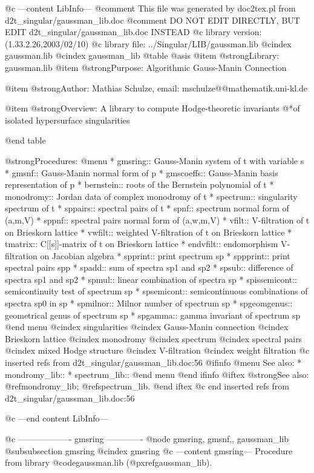 @c ---content LibInfo---
@comment This file was generated by doc2tex.pl from d2t_singular/gaussman_lib.doc
@comment DO NOT EDIT DIRECTLY, BUT EDIT d2t_singular/gaussman_lib.doc INSTEAD
@c library version: (1.33.2.26,2003/02/10)
@c library file: ../Singular/LIB/gaussman.lib
@cindex gaussman.lib
@cindex gaussman_lib
@table @asis
@item @strong{Library:}
gaussman.lib
@item @strong{Purpose:}
  Algorithmic Gauss-Manin Connection

@item @strong{Author:}
Mathias Schulze, email: mschulze@@mathematik.uni-kl.de

@item @strong{Overview:}
A library to compute Hodge-theoretic invariants
@*of isolated hypersurface singularities

@end table

@strong{Procedures:}
@menu
* gmsring:: Gauss-Manin system of t with variable s
* gmsnf:: Gauss-Manin normal form of p
* gmscoeffs:: Gauss-Manin basis representation of p
* bernstein:: roots of the Bernstein polynomial of t
* monodromy:: Jordan data of complex monodromy of t
* spectrum:: singularity spectrum of t
* sppairs:: spectral pairs of t
* spnf:: spectrum normal form of (a,m,V)
* sppnf:: spectral pairs normal form of (a,w,m,V)
* vfilt:: V-filtration of t on Brieskorn lattice
* vwfilt:: weighted V-filtration of t on Brieskorn lattice
* tmatrix:: C[[s]]-matrix of t on Brieskorn lattice
* endvfilt:: endomorphism V-filtration on Jacobian algebra
* spprint:: print spectrum sp
* sppprint:: print spectral pairs spp
* spadd:: sum of spectra sp1 and sp2
* spsub:: difference of spectra sp1 and sp2
* spmul:: linear combination of spectra sp
* spissemicont:: semicontinuity test of spectrum sp
* spsemicont:: semicontinuous combinations of spectra sp0 in sp
* spmilnor:: Milnor number of spectrum sp
* spgeomgenus:: geometrical genus of spectrum sp
* spgamma:: gamma invariant of spectrum sp
@end menu
@cindex singularities
@cindex Gauss-Manin connection
@cindex Brieskorn lattice
@cindex monodromy
@cindex spectrum
@cindex spectral pairs
@cindex mixed Hodge structure
@cindex V-filtration
@cindex weight filtration
@c inserted refs from d2t_singular/gaussman_lib.doc:56
@ifinfo
@menu
See also:
* mondromy_lib::
* spectrum_lib::
@end menu
@end ifinfo
@iftex
@strong{See also:}
@ref{mondromy_lib};
@ref{spectrum_lib}.
@end iftex
@c end inserted refs from d2t_singular/gaussman_lib.doc:56

@c ---end content LibInfo---

@c ------------------- gmsring -------------
@node gmsring, gmsnf,, gaussman_lib
@subsubsection gmsring
@cindex gmsring
@c ---content gmsring---
Procedure from library @code{gaussman.lib} (@pxref{gaussman_lib}).

